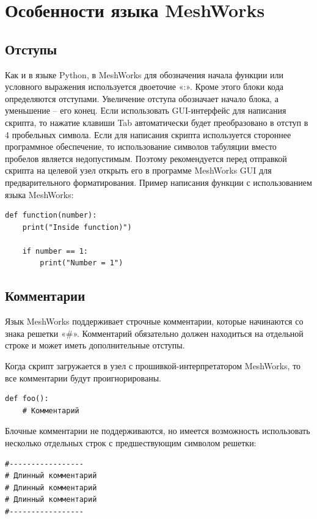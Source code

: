 \documentclass[12pt]{article}
\begin{document}
\section{Особенности языка MeshWorks}
\subsection{Отступы}
Как и в языке Python, в MeshWorks для обозначения начала функции или условного 
выражения используется двоеточие «:». Кроме этого блоки кода определяются отступами. 
Увеличение отступа обозначает начало блока, а уменьшение – его конец. Если 
использовать GUI-интерфейс для написания скрипта, то нажатие клавиши Tab автоматически 
будет преобразовано в отступ в 4 пробельных символа. Если для написания скрипта 
используется стороннее программное обеспечение, то использование символов табуляции 
вместо пробелов является недопустимым. Поэтому рекомендуется перед отправкой скрипта 
на целевой узел открыть его в программе MeshWorks GUI для предварительного форматирования.
Пример написания функции с использованием языка MeshWorks:
\begin{verbatim}
def function(number):
    print("Inside function)")
    
    if number == 1:
        print("Number = 1")
\end{verbatim}

\subsection{Комментарии}
Язык MeshWorks поддерживает строчные комментарии, которые начинаются со знака 
решетки «\#». Комментарий обязательно должен находиться на отдельной строке и 
может иметь дополнительные отступы.

Когда скрипт загружается в узел с прошивкой-интерпретатором MeshWorks, то все 
комментарии будут проигнорированы.
\begin{verbatim}
def foo():
    # Комментарий
\end{verbatim}

Блочные комментарии не поддерживаются, но имеется возможность использовать 
несколько отдельных строк с предшествующим символом решетки:
\begin{verbatim}
#-----------------
# Длинный комментарий
# Длинный комментарий
# Длинный комментарий
#-----------------
\end{verbatim}
\end{document}
